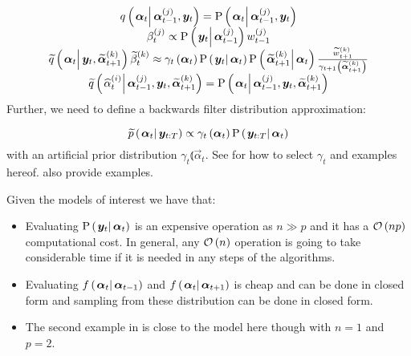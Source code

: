 \begin{equation}\begin{matrix}
	\IDC{\vec{\alpha}_t}{\partic{\vec{\alpha}}{t-1}{j}, \vec{y}_t} = \propC{\vec{\alpha}_t}{\partic{\vec{\alpha}}{t-1}{j}, \vec{y}_t} \\
	\partic{\beta}{t}{j} \propto \propC{\vec{y}_t}{\partic{\vec{\alpha}}{t-1}{j}}\partic{w}{t-1}{j} \\
%
	\IDAproxC{\vec{\alpha}_t}{\vec{y}_t, \particB{\vec{\alpha}}{t + 1}{k}}\particB{\beta}{t}{k} \approx %
		\gamma_t\Lparen{\vec{\alpha}_t}
		\propC{\vec{y}_t}{\vec{\alpha}_t}
		\propC{\particB{\vec{\alpha}}{t + 1}{k}}{\vec{\alpha}_t}
		\frac{\particB{w}{t + 1}{k}}{\gamma_{t + 1}\Lparen{\particB{\vec{\alpha}}{t + 1}{k}}} \\
%
	\IDAproxC{\particS{\alpha}{t}{i}}{\partic{\vec{\alpha}}{t-1}{j},\vec{y}_t, \particB{\vec{\alpha}}{t+1}{k}} = 
		\propC{\vec{\alpha}_t}{\partic{\vec{\alpha}}{t-1}{j},\vec{y}_t, \particB{\vec{\alpha}}{t+1}{k}}
\end{matrix}\end{equation}%
%
Further, we need to define a backwards filter distribution approximation:

\begin{equation}
	\propAproxC{\vec{\alpha}_t}{\vec{y}_{t:T}} \propto \gamma_t \Lparen{\vec{\alpha}_t}\propC{\vec{y}_{t:T}}{\vec{\alpha}_t}
\end{equation}%
%
with an artificial prior distribution $\gamma_t \Lparen{\vec{\alpha}_t}$. See \cite{briers10} for how to select $\gamma_t$ and examples hereof. \cite{fearnhead10} also provide examples. 

Given the models of interest we have that:

\begin{itemize}
	\item Evaluating $\propC{\vec{y}_t}{\vec{\alpha}_t}$ is an expensive operation as $n \gg p$ and it has a $\mathcal{O}\left( np\right)$ computational cost. In general, any $\mathcal{O}\left( n\right)$ operation is going to take considerable time if it is needed in any steps of the algorithms. 
	\item Evaluating $\optorC{f}{\vec{\alpha}_t}{\vec{\alpha}_{t -1}}$ and $\optorC{f}{\vec{\alpha}_t}{\vec{\alpha}_{t + 1}}$ is cheap and can be done in closed form and sampling from these distribution can be done in closed form.
	\item The second example in \cite{fearnhead10} is close to the model here though with $n = 1$ and $p = 2$. 
\end{itemize}

